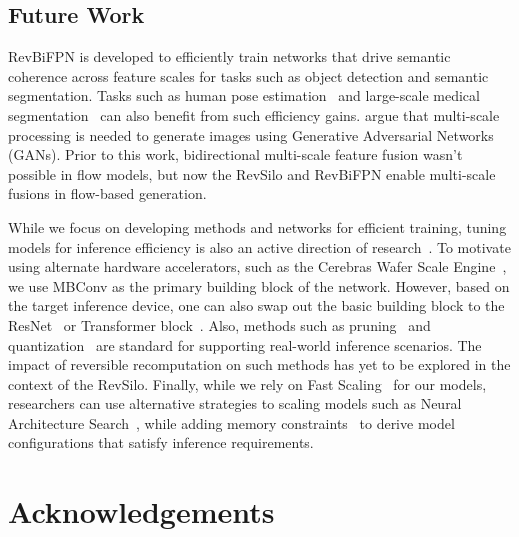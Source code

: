 \documentclass{article}
\begin{document}
\subsection{Future Work}
\label{sec:conclusion:futurework}

RevBiFPN is developed to efficiently train networks that drive semantic coherence across feature scales for tasks such as object detection and semantic segmentation.
Tasks such as human pose estimation~\cite{newell2016stacked} and large-scale medical segmentation~\cite{zhou2018unet} can also benefit from such efficiency gains.
\citet{awiszus2020toad} argue that multi-scale processing is needed to generate images using Generative Adversarial Networks (GANs). 
Prior to this work, bidirectional multi-scale feature fusion wasn't possible in flow models, but now the RevSilo and RevBiFPN enable multi-scale fusions in flow-based generation.

While we focus on developing methods and networks for efficient training, tuning models for inference efficiency is also an active direction of research~\cite{mehta2021mobilevit,sandler2018mobilenetv2,ding2021repvgg}. 
To motivate using alternate hardware accelerators, such as the Cerebras Wafer Scale Engine~\cite{liehotchips,cerebrasHarnessingPower}, we use MBConv as the primary building block of the network.
However, based on the target inference device, one can also swap out the basic building block to the ResNet~\cite{he2016deep} or Transformer block~\cite{vaswani2017attention}.
Also, methods such as pruning~\cite{han2015learning,yu2017scalpel} and quantization~\cite{han2015deep,krishnamoorthi2018quantizing} are standard for supporting real-world inference scenarios. 
The impact of reversible recomputation on such methods has yet to be explored in the context of the RevSilo.
Finally, while we rely on Fast Scaling~\cite{dollar2021fast} for our models, researchers can use alternative strategies to scaling models such as Neural Architecture Search~\cite{tan2019mnasnet, ghiasi2019nasfpn, tan2019efficientnet}, while adding memory constraints~\cite{zhao2021memory} to derive model configurations that satisfy inference requirements.









\section*{Acknowledgements}
\end{document}

